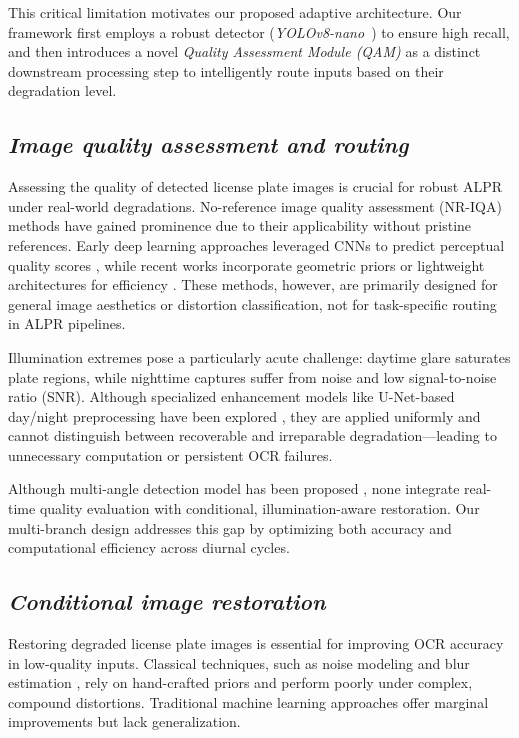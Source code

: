 \documentclass[a4paper,11pt,twocolumn]{article}
\begin{document}
	This critical limitation motivates our proposed adaptive architecture. Our framework first employs a robust detector (\textit{YOLOv8-nano}~\cite{Yaseen2024WhatIY}) to ensure high recall, and then introduces a novel \textit{Quality Assessment Module (QAM)} as a distinct downstream processing step to intelligently route inputs based on their degradation level.
	
	\subsection{\textit{Image quality assessment and routing}}
	
	Assessing the quality of detected license plate images is crucial for robust ALPR under real-world degradations. No-reference image quality assessment (NR-IQA) methods have gained prominence due to their applicability without pristine references. Early deep learning approaches leveraged CNNs to predict perceptual quality scores \cite{simone2017,nima2018}, while recent works incorporate geometric priors \cite{shin2024} or lightweight architectures for efficiency \cite{lariqa}. These methods, however, are primarily designed for general image aesthetics or distortion classification, not for task-specific routing in ALPR pipelines.
	
	Illumination extremes pose a particularly acute challenge: daytime glare saturates plate regions, while nighttime captures suffer from noise and low signal-to-noise ratio (SNR). Although specialized enhancement models like U-Net-based day/night preprocessing have been explored \cite{Chowdhury2019ANU}, they are applied uniformly and cannot distinguish between recoverable and irreparable degradation—leading to unnecessary computation or persistent OCR failures.
	
	Although multi-angle detection model has been proposed \cite{TranAnh2023LicensePR}, none integrate real-time quality evaluation with conditional, illumination-aware restoration. Our multi-branch design addresses this gap by optimizing both accuracy and computational efficiency across diurnal cycles.
	
	\subsection{\textit{Conditional image restoration}}
	
	Restoring degraded license plate images is essential for improving OCR accuracy in low-quality inputs. Classical techniques, such as noise modeling and blur estimation \cite{maru2017}, rely on hand-crafted priors and perform poorly under complex, compound distortions. Traditional machine learning approaches \cite{singhal2025} offer marginal improvements but lack generalization.
	
\end{document}

